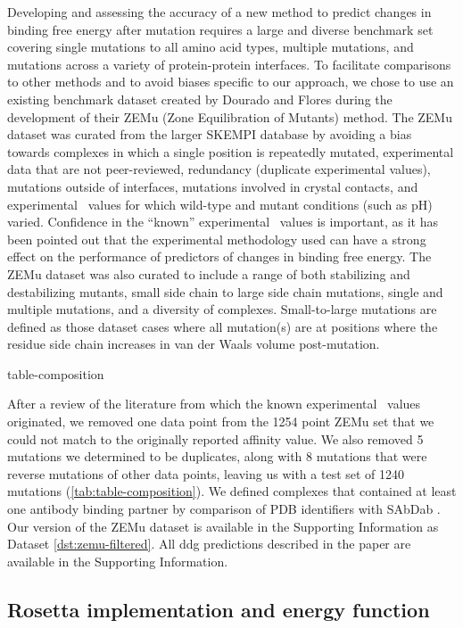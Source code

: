 Developing and assessing the accuracy of a new method to predict changes in binding free energy after mutation requires a large and diverse benchmark set covering single mutations to all amino acid types, multiple mutations, and mutations across a variety of protein-protein interfaces.
To facilitate comparisons to other methods and to avoid biases specific to our approach, we chose to use an existing benchmark dataset created by Dourado and Flores\cite{dourado_multiscale_2014} during the development of their ZEMu (Zone Equilibration of Mutants) method.
The ZEMu dataset was curated from the larger SKEMPI database\cite{moal_skempi:_2012} by avoiding a bias towards complexes in which a single position is repeatedly mutated, experimental data that are not peer-reviewed, redundancy (duplicate experimental values), mutations outside of interfaces, mutations involved in crystal contacts, and experimental \ddg\ values for which wild-type and mutant conditions (such as pH) varied.
Confidence in the ``known'' experimental \ddg\ values is important, as it has been pointed out that the experimental methodology used can have a strong effect on the performance of predictors of changes in binding free energy\cite{geng_exploring_2016}.
The ZEMu dataset was also curated to include a range of both stabilizing and destabilizing mutants, small side chain to large side chain mutations, single and multiple mutations, and a diversity of complexes.
Small-to-large mutations are defined as those dataset cases where all mutation(s) are at positions where the residue side chain increases in van der Waals volume post-mutation.

{table-composition}

After a review of the literature from which the known experimental \ddg\ values originated, we removed one data point from the 1254 point ZEMu set that we could not match to the originally reported affinity value. We also removed 5 mutations we determined to be duplicates, along with 8 mutations that were reverse mutations of other data points, leaving us with a test set of 1240 mutations (\cref{tab:table-composition}).
We defined complexes that contained at least one antibody binding partner by comparison of PDB identifiers with SAbDab \cite{dunbar_sabdab:_2014}.
Our version of the ZEMu dataset is available in the Supporting Information as Dataset \ref{dst:zemu-filtered}.
All ddg predictions described in the paper are available in the Supporting Information.

\subsection{Rosetta implementation and energy function}

